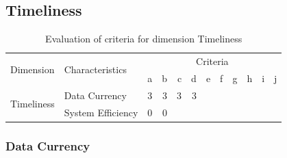 \subsection{Timeliness}

\begin{table}[htbp]
    \centering

    \begin{tabular}{llrrrrrrrrrr}
        \toprule
        \multirow{2}{*}{Dimension}  & \multirow{2}{*}{Characteristics}  & \multicolumn{10}{c}{Criteria}         \\ \cmidrule(lr){3-12}
                                    &                                   & a & b & c & d & e & f & g & h & i & j \\ \midrule
        \multirow{2}{*}{Timeliness} & Data Currency                     & 3 & 3 & 3 & 3 &   &   &   &   &   &   \\
                                    & System Efficiency                 & 0 & 0 &   &   &   &   &   &   &   &   \\
        \bottomrule
    \end{tabular}

    \caption{Evaluation of criteria for dimension Timeliness}
    \label{table:timeliness-benchmark}
\end{table}
\FloatBarrier

\subsubsection{Data Currency}

